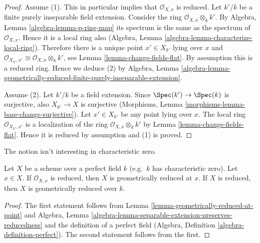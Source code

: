\begin{proof}
Assume (1). This in particular implies that $\mathcal{O}_{X, x}$
is reduced. Let $k'/k$ be a finite purely inseparable field
extension. Consider the ring $\mathcal{O}_{X, x} \otimes_k k'$.
By Algebra, Lemma \ref{algebra-lemma-p-ring-map}
its spectrum is the same as the spectrum of $\mathcal{O}_{X, x}$.
Hence it is a local ring also
(Algebra, Lemma \ref{algebra-lemma-characterize-local-ring}).
Therefore there is a unique point $x' \in X_{k'}$ lying over $x$
and $\mathcal{O}_{X_{k'}, x'} \cong \mathcal{O}_{X, x} \otimes_k k'$,
see Lemma \ref{lemma-change-fields-flat}.
By assumption this is a reduced ring. Hence we deduce (2) by
Algebra, Lemma
\ref{algebra-lemma-geometrically-reduced-finite-purely-inseparable-extension}.

\medskip\noindent
Assume (2). Let $k'/k$ be a field extension. Since
$\Spec(k') \to \Spec(k)$ is surjective, also
$X_{k'} \to X$ is surjective
(Morphisms, Lemma \ref{morphisms-lemma-base-change-surjective}).
Let $x' \in X_{k'}$ be any point lying over $x$.
The local ring $\mathcal{O}_{X_{k'}, x'}$
is a localization of the ring $\mathcal{O}_{X, x} \otimes_k k'$
by Lemma \ref{lemma-change-fields-flat}.
Hence it is reduced by assumption and (1) is proved.
\end{proof}

\noindent
The notion isn't interesting in characteristic zero.

\begin{lemma}
\label{lemma-perfect-reduced}
Let $X$ be a scheme over a perfect field $k$ (e.g.\ $k$ has
characteristic zero). Let $x \in X$. If $\mathcal{O}_{X, x}$ is
reduced, then $X$ is geometrically reduced at $x$.
If $X$ is reduced, then $X$ is geometrically reduced over $k$.
\end{lemma}

\begin{proof}
The first statement follows from
Lemma \ref{lemma-geometrically-reduced-at-point} and
Algebra, Lemma \ref{algebra-lemma-separable-extension-preserves-reducedness}
and the definition of a perfect field
(Algebra, Definition \ref{algebra-definition-perfect}).
The second statement follows from the first.
\end{proof}

